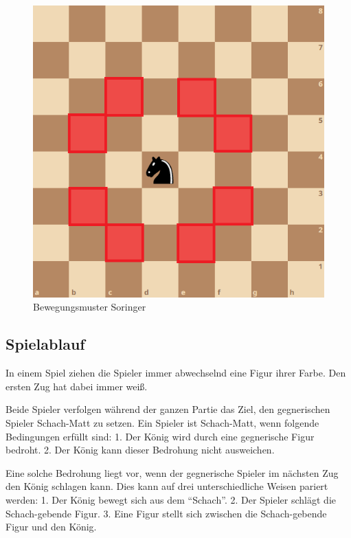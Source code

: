 \documentclass[12pt]{article}
\begin{document}
\begin{itemize}
		\begin{figure}
			\centering
			\includegraphics{../Abbildungen/Springer.png} 
			\caption{Bewegungsmuster Soringer}
		\end{figure}
\end{itemize}


    \hypertarget{spielablauf}{%
\subsection{Spielablauf}\label{spielablauf}}

    In einem Spiel ziehen die Spieler immer abwechselnd eine Figur ihrer
Farbe. Den ersten Zug hat dabei immer weiß.

Beide Spieler verfolgen während der ganzen Partie das Ziel, den
gegnerischen Spieler Schach-Matt zu setzen. Ein Spieler ist Schach-Matt,
wenn folgende Bedingungen erfüllt sind: 1. Der König wird durch eine
gegnerische Figur bedroht. 2. Der König kann dieser Bedrohung nicht
ausweichen.

Eine solche Bedrohung liegt vor, wenn der gegnerische Spieler im
nächsten Zug den König schlagen kann. Dies kann auf drei
unterschiedliche Weisen pariert werden: 1. Der König bewegt sich aus dem
``Schach''. 2. Der Spieler schlägt die Schach-gebende Figur. 3. Eine
Figur stellt sich zwischen die Schach-gebende Figur und den König.
\end{document}

